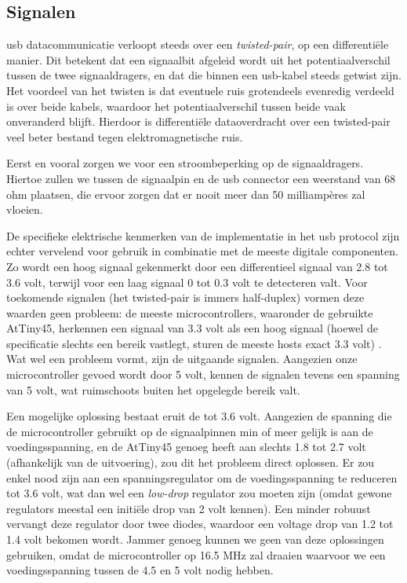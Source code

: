 \documentclass[verslag.tex]{subfiles}
\begin{document}
\subsection{Signalen}

\ac{usb} datacommunicatie verloopt steeds over een \emph{twisted-pair}, op een differentiële manier. Dit betekent dat een signaalbit afgeleid wordt uit het potentiaalverschil tussen de twee signaaldragers, en dat die binnen een \ac{usb}-kabel steeds getwist zijn. Het voordeel van het twisten is dat eventuele ruis grotendeels evenredig verdeeld is over beide kabels, waardoor het potentiaalverschil tussen beide vaak onveranderd blijft. Hierdoor is differentiële dataoverdracht over een twisted-pair veel beter bestand tegen elektromagnetische ruis.

Eerst en vooral zorgen we voor een stroombeperking op de signaaldragers. Hiertoe zullen we tussen de signaalpin en de \ac{usb} connector een weerstand van 68 ohm plaatsen, die ervoor zorgen dat er nooit meer dan 50 milliampères zal vloeien.

De specifieke elektrische kenmerken van de implementatie in het \ac{usb} protocol zijn echter vervelend voor gebruik in combinatie met de meeste digitale componenten. Zo wordt een hoog signaal gekenmerkt door een differentieel signaal van 2.8 tot 3.6 volt, terwijl voor een laag signaal 0 tot 0.3 volt te detecteren valt. Voor toekomende signalen (het twisted-pair is immers half-duplex) vormen deze waarden geen probleem: de meeste microcontrollers, waaronder de gebruikte AtTiny45, herkennen een signaal van 3.3 volt als een hoog signaal (hoewel de specificatie slechts een bereik vastlegt, sturen de meeste hosts exact 3.3 volt) . Wat wel een probleem vormt, zijn de uitgaande signalen. Aangezien onze microcontroller gevoed wordt door 5 volt, kennen de signalen tevens een spanning van 5 volt, wat ruimschoots buiten het opgelegde bereik valt.

Een mogelijke oplossing bestaat eruit de  tot 3.6 volt. Aangezien de spanning die de microcontroller gebruikt op de signaalpinnen min of meer gelijk is aan de voedingsspanning, en de AtTiny45 genoeg heeft aan slechts 1.8 tot 2.7 volt (afhankelijk van de uitvoering), zou dit het probleem direct oplossen. Er zou enkel nood zijn aan een spanningsregulator om de voedingsspanning te reduceren tot 3.6 volt, wat dan wel een \emph{low-drop} regulator zou moeten zijn (omdat gewone regulators meestal een initiële drop van 2 volt kennen). Een minder robuust vervangt deze regulator door twee diodes, waardoor een voltage drop van 1.2 tot 1.4 volt bekomen wordt.
Jammer genoeg kunnen we geen van deze oplossingen gebruiken, omdat de microcontroller op 16.5 MHz zal draaien waarvoor we een voedingsspanning tussen de 4.5 en 5 volt nodig hebben.
\end{document}
